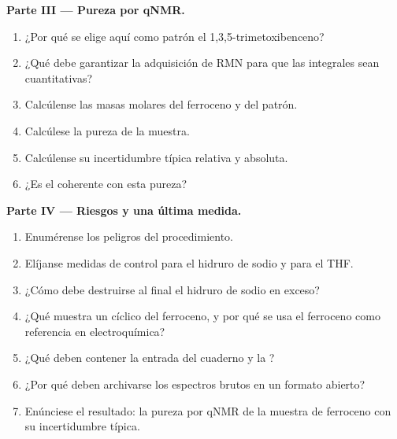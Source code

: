 \begin{problem}
\medskip\noindent\textbf{Parte III --- Pureza por qNMR.}
\begin{enumerate}[resume]
  \item ¿Por qué se elige aquí como patrón el 1,3,5-trimetoxibenceno?
  \item ¿Qué debe garantizar la adquisición de RMN para que las integrales sean cuantitativas?
  \item Calcúlense las masas molares del ferroceno y del patrón.
  \item Calcúlese la pureza de la muestra.
  \item Calcúlense su incertidumbre típica relativa y absoluta.
  \item ¿Es el  coherente con esta pureza?
\end{enumerate}

\medskip\noindent\textbf{Parte IV --- Riesgos y una última medida.}
\begin{enumerate}[resume]
  \item Enumérense los peligros del procedimiento.
  \item Elíjanse medidas de control para el hidruro de sodio y para el THF.
  \item ¿Cómo debe destruirse al final el hidruro de sodio en exceso?
  \item ¿Qué muestra un  cíclico del ferroceno, y por qué se usa el ferroceno
        como referencia en electroquímica?
  \item ¿Qué deben contener la entrada del cuaderno y la ?
  \item ¿Por qué deben archivarse los espectros brutos en un formato abierto?
  \item Enúnciese el resultado: la pureza por qNMR de la muestra de ferroceno con su incertidumbre
        típica.
\end{enumerate}
\end{problem}
